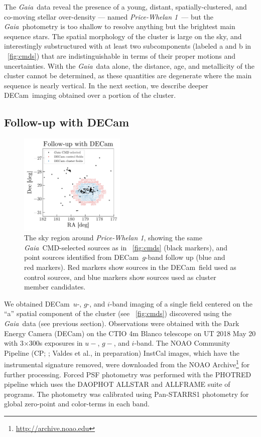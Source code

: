\documentclass[twocolumn]{aastex62}
\newcommand{\gaia}{\textsl{Gaia}}
\newcommand{\decam}{DECam}
\newcommand{\clustername}{\textsl{Price-Whelan 1}}
\begin{document}
The \gaia\ data reveal the presence of a young, distant, spatially-clustered, and co-moving stellar over-density --- named \clustername\ --- but the \gaia\ photometry is too shallow to resolve anything but the brightest main sequence stars.
The spatial morphology of the cluster is large on the sky, and interestingly substructured with at least two subcomponents (labeled a and b in \figurename~\ref{fig:cmds}) that are indistinguishable in terms of their proper motions and uncertainties.
With the \gaia\ data alone, the distance, age, and metallicity of the cluster  cannot be determined, as these quantities are degenerate where the main sequence is nearly vertical.
In the next section, we describe deeper \decam\ imaging obtained over a portion of the cluster.

\subsection{Follow-up with \decam}
\label{sec:decam}

\begin{figure}[t!]
\centering
\includegraphics[width=0.45\textwidth]{figures/DECam-field.pdf}
\caption{The sky region around \clustername, showing the same \gaia\ CMD-selected sources as in \figurename~\ref{fig:cmds} (black markers), and point sources identified from \decam\ $g$-band follow up (blue and red markers).
Red markers show sources in the \decam\ field used as control sources, and blue markers show sources used as cluster member candidates.}
\label{fig:decam-field}
\end{figure}

We obtained \decam\ $u$-, $g$-, and $i$-band imaging of a single field centered on the ``a'' spatial component of the cluster (see \figurename~\ref{fig:cmds}) discovered using the \gaia\ data (see previous section).  Observations were obtained with the Dark Energy Camera (DECam) on the CTIO 4m Blanco telescope on UT 2018 May 20 with 3$\times$300s
exposures in $u-$, $g-$, and $i$-band.  The NOAO Community Pipeline (CP; \citealt{Valdes:2014}; Valdes et al., in preparation) InstCal images, which have the instrumental signature removed, were downloaded from the NOAO Archive\footnote{\url{http://archive.noao.edu}} for further processing.  Forced PSF photometry was performed with the PHOTRED pipeline \citep{Nidever:2017} which uses the DAOPHOT ALLSTAR \citep{Stetson:1987} and ALLFRAME \citep{Stetson:1994} suite of programs.  The photometry was calibrated using Pan-STARRS1 \citep[PS1;][]{Chambers:2016} photometry for global zero-point and color-terms in each band.
\end{document}
